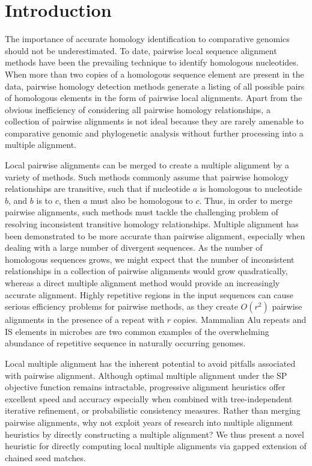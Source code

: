\documentclass{ws-procs975x65}
\begin{document}

\section{Introduction}
The importance of accurate homology identification to comparative genomics should not be underestimated\cite{Kumar07}. To date, pairwise local sequence alignment methods\cite{ref-blastz,ref-ssearch} have been the prevailing technique to identify homologous nucleotides.  When more than two copies of a homologous sequence element are present in the data, pairwise homology detection methods generate a listing of all possible pairs of homologous elements in the form of pairwise local alignments.  Apart from the obvious inefficiency of considering all pairwise homology relationships, a collection of pairwise alignments is not ideal because they are rarely amenable to comparative genomic and phylogenetic analysis without further processing into a multiple alignment.

Local pairwise alignments can be merged to create a multiple alignment by a variety of methods\cite{ref-tba,ref-aba,ref-dialign,ref-related1}. Such methods commonly assume that pairwise homology relationships are transitive, such that if nucleotide $a$ is homologous to nucleotide $b$, and $b$ is to $c$, then $a$ must also be homologous to $c$.  Thus, in order to merge pairwise alignments, such methods must tackle the challenging problem of resolving inconsistent transitive homology relationships.  Multiple alignment has been demonstrated to be more accurate than pairwise alignment, especially when dealing with a large number of divergent sequences\cite{ref-mlagan,ref-aubergene}.  As the number of homologous sequences grows, we might expect that the number of inconsistent relationships in a collection of pairwise alignments would grow quadratically, whereas a direct multiple alignment method would provide an increasingly accurate alignment.  Highly repetitive regions in the input sequences can cause serious efficiency problems for pairwise methods, as they create $O(r^{2})$ pairwise alignments in the presence of a repeat with $r$ copies.  Mammalian Alu repeats and IS elements in microbes are two common examples of the overwhelming abundance of repetitive sequence in naturally occurring genomes.

Local multiple alignment has the inherent potential to avoid pitfalls associated with pairwise alignment. Although optimal multiple alignment under the SP objective function remains intractable\cite{ref-wangjiang}, progressive alignment heuristics offer excellent speed and accuracy\cite{ref-clustalw,ref-tcoffee} especially when combined with tree-independent iterative refinement\cite{ref-muscle}, or probabilistic consistency measures\cite{ref-probcons}. Rather than merging pairwise alignments, why not exploit years of research into multiple alignment heuristics by directly constructing a multiple alignment? We thus present a novel heuristic for directly computing local multiple alignments via gapped extension of chained seed matches.
\end{document}
